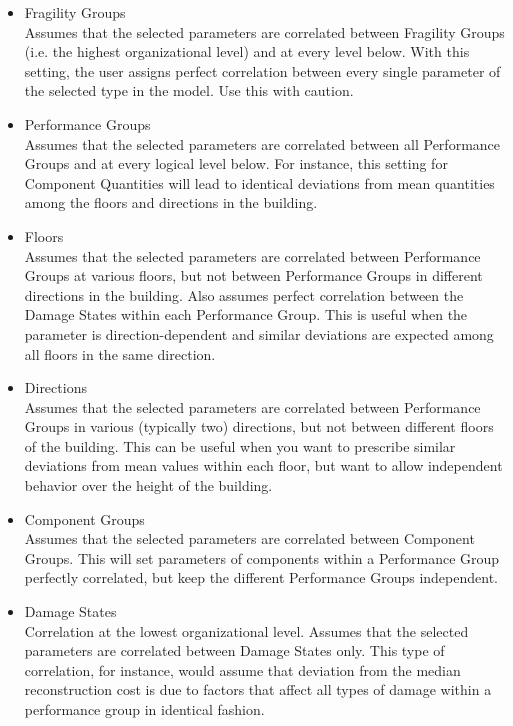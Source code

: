 \begin{itemize}    
    \item Fragility Groups\\
    Assumes that the selected parameters are correlated between Fragility Groups (i.e. the highest organizational level) and at every level below. With this setting, the user assigns perfect correlation between every single parameter of the selected type in the model. Use this with caution.
    \item Performance Groups\\
    Assumes that the selected parameters are correlated between all Performance Groups and at every logical level below. For instance, this setting for Component Quantities will lead to identical deviations from mean quantities among the floors and directions in the building.
    \item Floors\\
    Assumes that the selected parameters are correlated between Performance Groups at various floors, but not between Performance Groups in different directions in the building. Also assumes perfect correlation between the Damage States within each Performance Group. This is useful when the parameter is direction-dependent and similar deviations are expected among all floors in the same direction.
    \item Directions\\
    Assumes that the selected parameters are correlated between Performance Groups in various (typically two) directions, but not between different floors of the building. This can be useful when you want to prescribe similar deviations from mean values within each floor, but want to allow independent behavior over the height of the building.
    \item Component Groups\\
    Assumes that the selected parameters are correlated between Component Groups. This will set parameters of components within a Performance Group perfectly correlated, but keep the different Performance Groups independent.
    \item Damage States\\
    Correlation at the lowest organizational level. Assumes that the selected parameters are correlated between Damage States only. This type of correlation, for instance, would assume that deviation from the median reconstruction cost is due to factors that affect all types of damage within a performance group in identical fashion.
\end{itemize}

